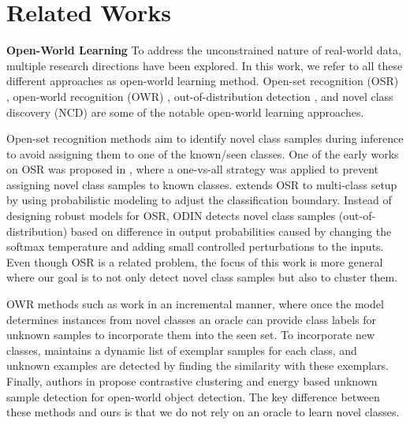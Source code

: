 \documentclass[runningheads]{eccv2022submission}
\begin{document}
\section{Related Works}
\textbf{Open-World Learning}
To address the unconstrained nature of real-world data, multiple research directions have been explored. In this work, we refer to all these different approaches as open-world learning method. Open-set recognition (OSR) \cite{scheirer2012toward,jain2014multi,liang2017enhancing}, open-world recognition (OWR) \cite{bendale2015towards,boult2019learning,xu2019open,joseph2021towards}, out-of-distribution detection \cite{liang2017enhancing,lee2018simple,zaeemzadeh2021out,kardan2021towards,kardan2021self}, and novel class discovery (NCD) \cite{hsu2018learning,han2019learning,Han2020Automatically,Zhong_2021_CVPR,fini2021unified} are some of the notable open-world learning approaches.

Open-set recognition methods aim to identify novel class samples during inference to avoid assigning them to one of the known/seen classes. 
One of the early works on OSR was proposed in \cite{scheirer2012toward}, where a one-vs-all strategy was applied to prevent assigning novel class samples to known classes. \cite{jain2014multi} extends OSR to multi-class setup by using probabilistic modeling to adjust the classification boundary. Instead of designing robust models for OSR, ODIN \cite{liang2017enhancing} detects novel class samples (out-of-distribution) based on difference in output probabilities caused by changing the softmax temperature and adding small controlled perturbations to the inputs. Even though OSR is a related problem, the focus of this work is more general where our goal is to not only detect novel class samples but also to cluster them.

OWR methods such as \cite{bendale2015towards} work in an incremental manner, where once the model determines instances from novel classes an oracle can provide class labels for unknown samples to incorporate them into the seen set. To incorporate new classes, \cite{xu2019open} maintains a dynamic list of exemplar samples for each class, and unknown examples are detected by finding the similarity with these exemplars. Finally, authors in \cite{joseph2021towards} propose contrastive clustering and energy based unknown sample detection for open-world object detection. The key difference between these methods and ours is that we do not rely on an oracle to learn novel classes.       
\end{document}
